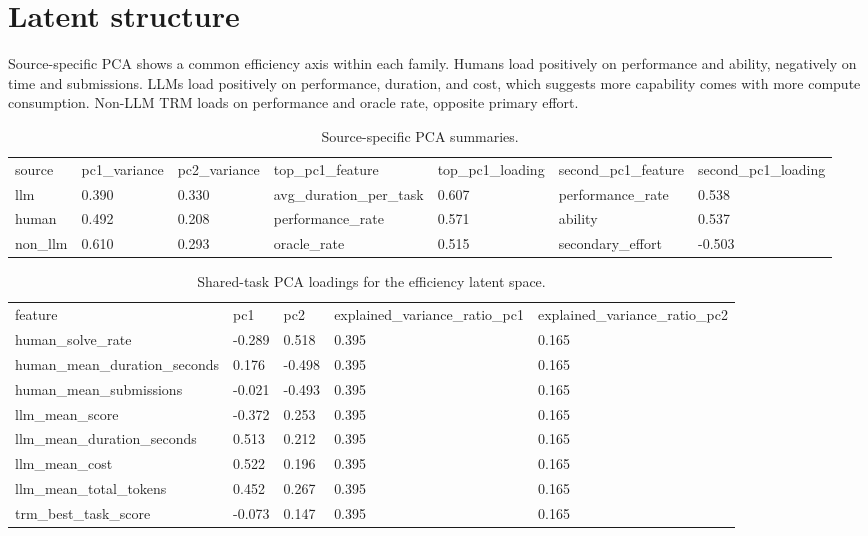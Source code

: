 \documentclass[11pt]{article}
\begin{document}
\section{Latent structure}
Source-specific PCA shows a common efficiency axis within each family. Humans load positively on performance and ability, negatively on time and submissions. LLMs load positively on performance, duration, and cost, which suggests more capability comes with more compute consumption. Non-LLM TRM loads on performance and oracle rate, opposite primary effort.
\begin{table}[htbp]
\centering
\caption{Source-specific PCA summaries.}
\label{tab:source_pca}
\begin{tabular}{lllllll}
\toprule
source & pc1\_variance & pc2\_variance & top\_pc1\_feature & top\_pc1\_loading & second\_pc1\_feature & second\_pc1\_loading \\
llm & 0.390 & 0.330 & avg\_duration\_per\_task & 0.607 & performance\_rate & 0.538 \\
human & 0.492 & 0.208 & performance\_rate & 0.571 & ability & 0.537 \\
non\_llm & 0.610 & 0.293 & oracle\_rate & 0.515 & secondary\_effort & -0.503 \\
\bottomrule
\end{tabular}
\end{table}
\begin{table}[htbp]
\centering
\caption{Shared-task PCA loadings for the efficiency latent space.}
\label{tab:shared_pca}
\begin{tabular}{lllll}
\toprule
feature & pc1 & pc2 & explained\_variance\_ratio\_pc1 & explained\_variance\_ratio\_pc2 \\
human\_solve\_rate & -0.289 & 0.518 & 0.395 & 0.165 \\
human\_mean\_duration\_seconds & 0.176 & -0.498 & 0.395 & 0.165 \\
human\_mean\_submissions & -0.021 & -0.493 & 0.395 & 0.165 \\
llm\_mean\_score & -0.372 & 0.253 & 0.395 & 0.165 \\
llm\_mean\_duration\_seconds & 0.513 & 0.212 & 0.395 & 0.165 \\
llm\_mean\_cost & 0.522 & 0.196 & 0.395 & 0.165 \\
llm\_mean\_total\_tokens & 0.452 & 0.267 & 0.395 & 0.165 \\
trm\_best\_task\_score & -0.073 & 0.147 & 0.395 & 0.165 \\
\bottomrule
\end{tabular}
\end{table}
\end{document}
